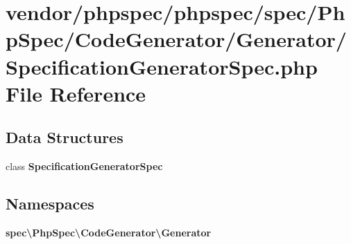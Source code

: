 \section{vendor/phpspec/phpspec/spec/\+Php\+Spec/\+Code\+Generator/\+Generator/\+Specification\+Generator\+Spec.php File Reference}
\label{_specification_generator_spec_8php}
\subsection*{Data Structures}
\begin{DoxyCompactItemize}
\item 
class {\bf Specification\+Generator\+Spec}
\end{DoxyCompactItemize}
\subsection*{Namespaces}
\begin{DoxyCompactItemize}
\item 
 {\bf spec\textbackslash{}\+Php\+Spec\textbackslash{}\+Code\+Generator\textbackslash{}\+Generator}
\end{DoxyCompactItemize}
